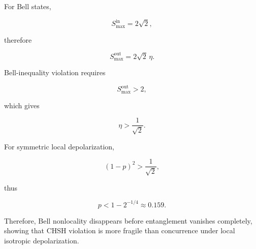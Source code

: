 \medskip

For Bell states,

\[
S_{\max}^{\mathrm{in}}
=
2\sqrt2,
\]

therefore

\begin{equation}
S_{\max}^{\mathrm{out}}
=
2\sqrt2\,\eta.
\end{equation}

Bell-inequality violation requires

\begin{equation}
S_{\max}^{\mathrm{out}}>2,
\end{equation}

which gives

\begin{equation}
\boxed{
\eta>\frac1{\sqrt2}
}.
\label{eq:d5_chsh_threshold}
\end{equation}

\medskip

For symmetric local depolarization,

\begin{equation}
(1-p)^2
>
\frac1{\sqrt2},
\end{equation}

thus

\begin{equation}
\boxed{
p
<
1-2^{-1/4}
\approx
0.159
}.
\end{equation}

\medskip

Therefore, Bell nonlocality disappears before entanglement vanishes completely, showing that CHSH violation is more fragile than concurrence under local isotropic depolarization.